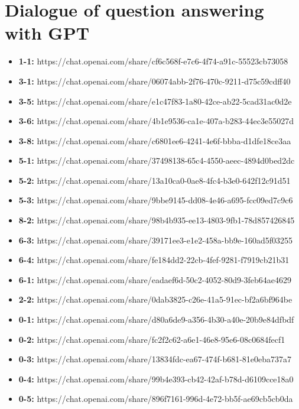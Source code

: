 \section{Dialogue of question answering with GPT}
\label{appendix:gpt}
\begin{itemize}
    \item \textbf{1-1:} https://chat.openai.com/share/cf6c568f-e7c6-4f74-a91c-55523cb73058
    \item \textbf{3-1:} https://chat.openai.com/share/06074abb-2f76-470c-9211-d75c59cdff40
    \item \textbf{3-5:} https://chat.openai.com/share/e1c47f83-1a80-42ce-ab22-5cad31ac0d2e
    \item \textbf{3-6:} https://chat.openai.com/share/4b1e9536-ca1e-407a-b283-44ec3e55027d
    \item \textbf{3-8:} https://chat.openai.com/share/c6801ee6-4241-4e6f-bbba-d1dfe18ce3aa
    \item \textbf{5-1:} https://chat.openai.com/share/37498138-65c4-4550-aeec-4894d0bed2dc
    \item \textbf{5-2:} https://chat.openai.com/share/13a10ca0-0ae8-4fc4-b3e0-642f12c91d51
    \item \textbf{5-3:} https://chat.openai.com/share/9bbe9145-dd08-4e46-a695-fcc09ed7c9c6
    \item \textbf{8-2:} https://chat.openai.com/share/98b4b935-ee13-4803-9fb1-78d857426845
    \item \textbf{6-3:} https://chat.openai.com/share/39171ee3-e1e2-458a-bb9e-160ad5f03255
    \item \textbf{6-4:} https://chat.openai.com/share/fe184dd2-22cb-4fef-9281-f7919cb21b31
    \item \textbf{6-1:} https://chat.openai.com/share/eadaef6d-50c2-4052-80d9-3feb64ae4629
    \item \textbf{2-2:} https://chat.openai.com/share/0dab3825-c26e-41a5-91ec-bf2a6bf964be
    \item \textbf{0-1:} https://chat.openai.com/share/d80a6de9-a356-4b30-a40e-20b9e84dfbdf
    \item \textbf{0-2:} https://chat.openai.com/share/fc2f2c62-a6e1-46e8-95e6-08c0684fecf1
    \item \textbf{0-3:} https://chat.openai.com/share/13834fdc-ea67-474f-b681-81e0eba737a7
    \item \textbf{0-4:} https://chat.openai.com/share/99b4e393-cb42-42af-b78d-d6109cce18a0
    \item \textbf{0-5:} https://chat.openai.com/share/896f7161-996d-4e72-bb5f-ae69cb5cb0da
\end{itemize}